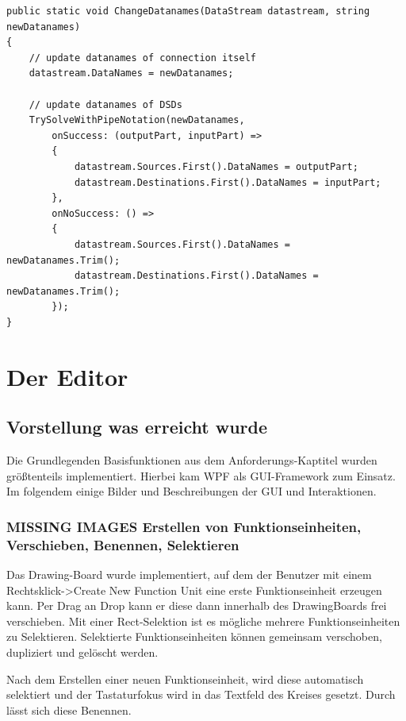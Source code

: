 \begin{enumerate}
	\begin{lstlisting}[caption=ChangeDatanames Methode]
public static void ChangeDatanames(DataStream datastream, string newDatanames)
{
	// update datanames of connection itself
	datastream.DataNames = newDatanames;
	
	// update datanames of DSDs
	TrySolveWithPipeNotation(newDatanames,
		onSuccess: (outputPart, inputPart) =>
		{
			datastream.Sources.First().DataNames = outputPart;
			datastream.Destinations.First().DataNames = inputPart;
		},
		onNoSuccess: () =>
		{
			datastream.Sources.First().DataNames = newDatanames.Trim();
			datastream.Destinations.First().DataNames = newDatanames.Trim();
		});
}
\end{lstlisting}
	
\end{enumerate}



\section{Der Editor}

\subsection{Vorstellung was erreicht wurde}


Die Grundlegenden Basisfunktionen aus dem Anforderungs-Kaptitel wurden größtenteils implementiert. Hierbei kam WPF als GUI-Framework zum Einsatz.
Im folgendem einige Bilder und Beschreibungen der GUI und Interaktionen.


\subsubsection{	MISSING IMAGES Erstellen von Funktionseinheiten, Verschieben, Benennen, Selektieren}

	Das Drawing-Board wurde implementiert, auf dem der Benutzer mit einem
	Rechtsklick->Create New Function Unit eine erste Funktionseinheit erzeugen
	kann. Per Drag an Drop kann er diese dann innerhalb des DrawingBoards frei
	verschieben. Mit einer Rect-Selektion ist es mögliche mehrere
	Funktionseinheiten zu Selektieren. Selektierte Funktionseinheiten können
	gemeinsam verschoben, dupliziert und gelöscht werden.
	
	Nach dem Erstellen einer neuen Funktionseinheit, wird diese automatisch
	selektiert und der Tastaturfokus wird in das Textfeld des Kreises gesetzt.
	Durch lässt sich diese Benennen.
	
